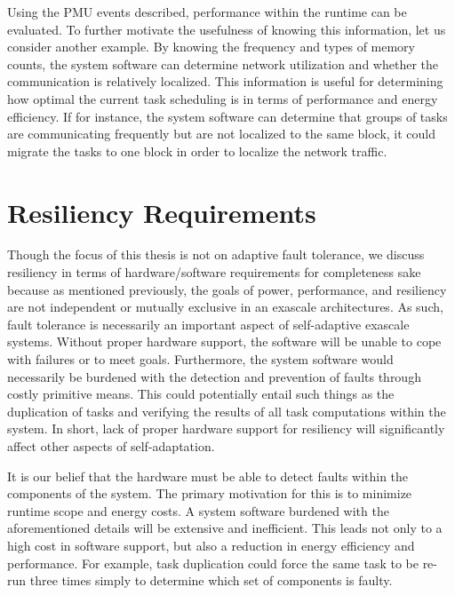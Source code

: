     Using the PMU events described, performance within the runtime can be evaluated. To further motivate the usefulness of knowing this information, let us consider another example. By knowing the frequency and types of memory counts, the system software can determine network utilization and whether the communication is relatively localized. This information is useful for determining how optimal the current task scheduling is in terms of performance and energy efficiency. If for instance, the system software can determine that groups of tasks are communicating frequently but are not localized to the same block, it could migrate the tasks to one block in order to localize the network traffic.


\section{Resiliency Requirements}
    Though the focus of this thesis is not on adaptive fault tolerance, we discuss resiliency in terms of hardware/software requirements for completeness sake because as mentioned previously, the goals of power, performance, and resiliency are not independent or mutually exclusive in an exascale architectures. As such, fault tolerance is necessarily an important aspect of self-adaptive exascale systems. Without proper hardware support, the software will be unable to cope with failures or to meet goals. Furthermore, the system software would necessarily be burdened with the detection and prevention of faults through costly primitive means. This could potentially entail such things as the duplication of tasks and verifying the results of all task computations within the system. In short, lack of proper hardware support for resiliency will significantly affect other aspects of self-adaptation.

    It is our belief that the hardware must be able to detect faults within the components of the system. The primary motivation for this is to minimize runtime scope and energy costs. A system software burdened with the aforementioned details will be extensive and inefficient. This leads not only to a high cost in software support, but also a reduction in energy efficiency and performance. For example, task duplication could force the same task to be re-run three times simply to determine which set of components is faulty.

